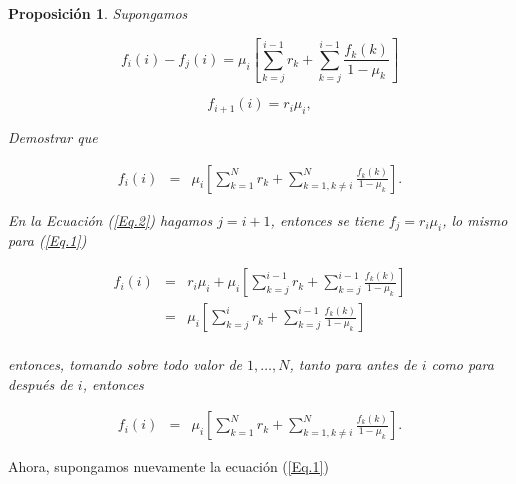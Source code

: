 \documentclass{article}
\newtheorem{Prop}{Proposición}
\begin{document}
\begin{Prop}
Supongamos

\begin{equation}\label{Eq.1}
f_{i}\left(i\right)-f_{j}\left(i\right)=\mu_{i}\left[\sum_{k=j}^{i-1}r_{k}+\sum_{k=j}^{i-1}\frac{f_{k}\left(k\right)}{1-\mu_{k}}\right]
\end{equation}

\begin{equation}\label{Eq.2}
f_{i+1}\left(i\right)=r_{i}\mu_{i},
\end{equation}

Demostrar que

\begin{eqnarray*}
f_{i}\left(i\right)&=&\mu_{i}\left[\sum_{k=1}^{N}r_{k}+\sum_{k=1,k\neq i}^{N}\frac{f_{k}\left(k\right)}{1-\mu_{k}}\right].
\end{eqnarray*}

En la Ecuaci\'on (\ref{Eq.2}) hagamos $j=i+1$, entonces se tiene $f_{j}=r_{i}\mu_{i}$, lo mismo para (\ref{Eq.1})

\begin{eqnarray*}
f_{i}\left(i\right)&=&r_{i}\mu_{i}+\mu_{i}\left[\sum_{k=j}^{i-1}r_{k}+\sum_{k=j}^{i-1}\frac{f_{k}\left(k\right)}{1-\mu_{k}}\right]\\
&=&\mu_{i}\left[\sum_{k=j}^{i}r_{k}+\sum_{k=j}^{i-1}\frac{f_{k}\left(k\right)}{1-\mu_{k}}\right]\\
\end{eqnarray*}

entonces, tomando sobre todo valor de $1,\ldots,N$, tanto para antes de $i$ como para despu\'es de $i$, entonces

\begin{eqnarray*}
f_{i}\left(i\right)&=&\mu_{i}\left[\sum_{k=1}^{N}r_{k}+\sum_{k=1,k\neq i}^{N}\frac{f_{k}\left(k\right)}{1-\mu_{k}}\right].
\end{eqnarray*}
\end{Prop}

Ahora, supongamos nuevamente la ecuaci\'on (\ref{Eq.1})
\end{document}
